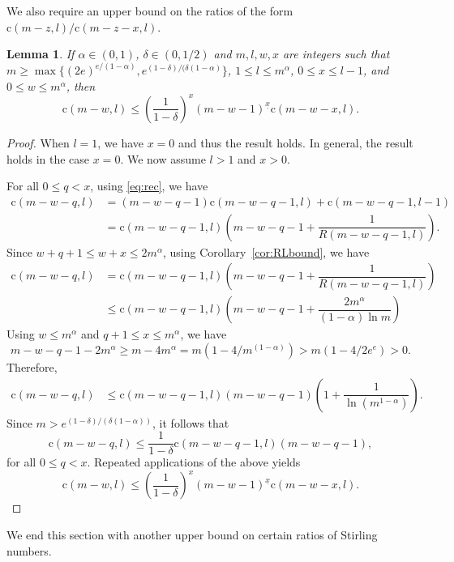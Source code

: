 \documentclass{amsart}
\newtheorem{lem}[thm]{Lemma}
\newcommand{\st}{\mathrm{c}}
\newcommand{\ff}[1]{^{\underline{#1}}}
\begin{document}
We also require an upper bound on the ratios of the form $\st(m-z,l)/\st(m-z-x,l)$. 

\begin{lem}\label{lem:keyineq1}
If $\alpha \in(0, 1)$, $\delta \in (0,1/2)$ and $m,l,w,x$ are  integers such that\\ $m\geq \max\{(2e)^{e/(1-\alpha)}, e^{(1-\delta)/(\delta(1-\alpha)}\}$, $1\leq l \leq m^{\alpha}$, $0\leq x \leq l-1$, and $0\leq w \leq m^{\alpha}$, then 
\[\st(m-w,l) \leq \left(\dfrac{1}{1-\delta} \right)^{x} (m-w-1)\ff{x} \st(m-w-x,l).\]
\end{lem}
\begin{proof}
When $l=1$, we have $x=0$ and thus the result holds. In general, the result holds in the case $x=0$. 
We now assume $l>1$ and $x>0$.

For all $0\leq q<x$, using \eqref{eq:rec}, we have 
\begin{align*}
\st(m-w-q,l) &= (m-w-q-1) \st(m-w-q-1,l) + \st(m-w-q-1,l-1)\\
&= \st(m-w-q-1,l) \left(m-w-q-1+ \dfrac{1}{R(m-w-q-1,l)} \right).
\end{align*}
Since $w+q+1\leq w+x \leq 2m^{\alpha}$, using Corollary~\ref{cor:RLbound}, we have 
\begin{align*}
\st(m-w-q,l)&=\st(m-w-q-1,l) \left(m-w-q-1+ \dfrac{1}{R(m-w-q-1,l)} \right) \\
&\leq \st(m-w-q-1,l) \left(m-w-q-1+ \dfrac{2m^{\alpha}}{(1-\alpha)\ln m} \right)
\end{align*}
Using $w\leq m^{\alpha}$ and $q+1\leq x\leq m^{\alpha}$, we have 
\[m-w-q-1-2m^{\alpha} \geq m-4m^{\alpha}=m(1-4/m^{(1-\alpha)})>m(1-4/2e^{e})>0.\]
Therefore, 
\begin{align*}
\st(m-w-q,l) &\leq \st(m-w-q-1,l)(m-w-q-1)\left(1+ \dfrac{1}{\ln (m^{1-\alpha})}\right).
\end{align*}
Since $m > e^{(1-\delta)/(\delta(1-\alpha))}$, it follows that 
\[
\st(m-w-q,l) \leq \dfrac{1}{1-\delta} \st(m-w-q-1,l)(m-w-q-1), 
\]
for all $0\leq q<x$. Repeated applications of the above yields
\[
\st(m-w,l) \leq \left(\frac{1}{1-\delta}\right)^{x}(m-w-1)\ff{x} \st(m-w-x,l).
\]
\end{proof}

We end this section with another upper bound on certain ratios of Stirling numbers.
\end{document}
